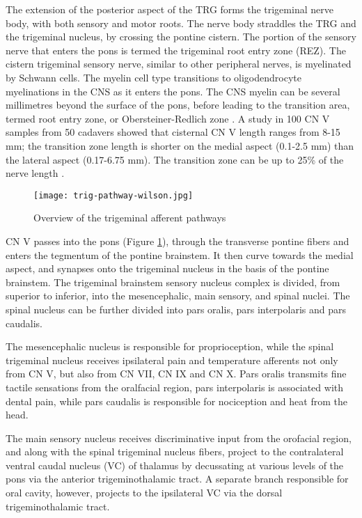 The extension of the posterior aspect of the TRG forms the trigeminal nerve body, with both sensory and motor roots. The nerve body straddles the TRG and the trigeminal nucleus, by crossing the pontine cistern. The portion of the sensory nerve that enters the pons is termed the trigeminal root entry zone (REZ). The cistern trigeminal sensory nerve, similar to other peripheral nerves, is myelinated by Schwann cells. The myelin cell type transitions to oligodendrocyte myelinations in the CNS as it enters the pons. The CNS myelin can be several millimetres beyond the surface of the pons, before leading to the transition area, termed root entry zone, or Obersteiner-Redlich zone \cite{Peker2006}. A study in 100 CN V samples from 50 cadavers showed that cisternal CN V length ranges from 8-15 mm; the transition zone length is shorter on the medial aspect (0.1-2.5 mm) than the lateral aspect (0.17-6.75 mm). The transition zone can be up to 25\% of the nerve length \cite{Peker2006}. 

 \begin{figure}[ht]
 \texttt{[image: trig-pathway-wilson.jpg]}
 \centering
 \caption{Overview of the trigeminal afferent pathways \protect\cite{wilson2010cranial}}
 \label{fig:trig-pathway}
 \end{figure}
 
CN V passes into the pons (Figure \ref{fig:trig-pathway}), through the transverse pontine fibers and enters the tegmentum of the pontine brainstem. It then curve towards the medial aspect, and synapses onto the trigeminal nucleus in the basis of the pontine brainstem. The trigeminal brainstem sensory nucleus complex is divided, from superior to inferior, into the mesencephalic, main sensory, and spinal nuclei. The spinal nucleus can be further divided into pars oralis, pars interpolaris and pars caudalis. 

The mesencephalic nucleus is responsible for proprioception, while the spinal trigeminal nucleus receives ipsilateral pain and temperature afferents not only from CN V, but also from CN VII, CN IX and CN X. Pars oralis transmits fine tactile sensations from the oralfacial region, pars interpolaris is associated with dental pain, while pars caudalis is responsible for nociception and heat from the head. 

The main sensory nucleus receives discriminative input from the orofacial region, and along with the spinal trigeminal nucleus fibers, project to the contralateral ventral caudal nucleus (VC) of thalamus by decussating at various levels of the pons via the anterior trigeminothalamic tract. A separate branch responsible for oral cavity, however, projects to the ipsilateral VC via the dorsal trigeminothalamic tract.  

